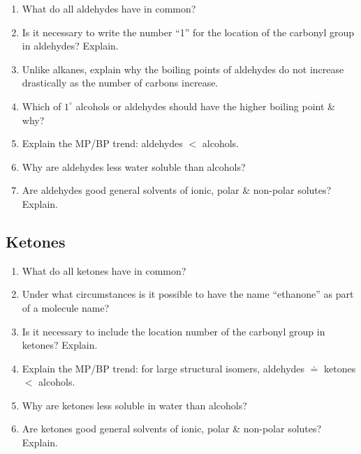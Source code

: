\documentclass[12pt]{article}
\begin{document}
\begin{enumerate}[label=\arabic*.]
    \item What do all aldehydes have in common?
    \vspace{1.5cm}
    \item Is it necessary to write the number “1” for the location of the carbonyl group in aldehydes? Explain.
    \vspace{1.5cm}
    \item Unlike alkanes, explain why the boiling points of aldehydes do not increase drastically as the number of carbons increase.
    \vspace{1.5cm}
    \item Which of $1^{\circ}$ alcohols or aldehydes should have the higher boiling point \& why?
    \vspace{1.5cm}
    \item Explain the MP/BP trend: aldehydes $<$ alcohols.
    \vspace{1.5cm}
    \item Why are aldehydes less water soluble than alcohols?
    \vspace{1.5cm}
    \item Are aldehydes good general solvents of ionic, polar \& non-polar solutes? Explain.
    \vspace{1.5cm}
\end{enumerate}

\begin{center}
    \subsection*{Ketones}
\end{center}

\begin{enumerate}[label=\arabic*.]
    \item What do all ketones have in common?
    \vspace{1.5cm}
    \item Under what circumstances is it possible to have the name “ethanone” as part of a molecule name?
    \vspace{1.5cm}
    \item Is it necessary to include the location number of the carbonyl group in ketones? Explain.
    \vspace{1.5cm}
    \item Explain the MP/BP trend: for large structural isomers, aldehydes $\doteq$ ketones $<$ alcohols.
    \vspace{1.5cm}
    \item Why are ketones less soluble in water than alcohols?
    \vspace{1.5cm}
    \item Are ketones good general solvents of ionic, polar \& non-polar solutes? Explain.
    \vspace{1.5cm}
\end{enumerate}
\end{document}
